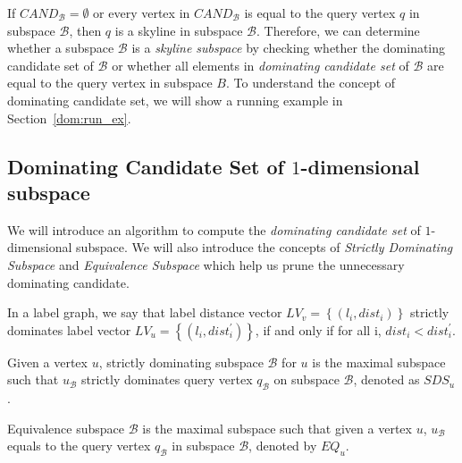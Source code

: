 If $\mathit{CAND}_\mathcal{B} = \emptyset$ or every vertex in $\mathit{CAND}_\mathcal{B}$ is equal to the query vertex $q$ in subspace $\mathcal{B}$, then $q$ is a skyline in subspace $\mathcal{B}$. Therefore, we can determine whether a subspace $\mathcal{B}$ is a \emph{skyline subspace} by checking whether the dominating candidate set of $\mathcal{B}$ or whether all elements in \emph{dominating candidate set} of $\mathcal{B}$ are equal to the query vertex in subspace $B$. To understand the concept of dominating candidate set, we will show a running example in Section~\ref{dom:run_ex}.

\subsection{Dominating Candidate Set of $1$-dimensional subspace}

We will introduce an algorithm to compute the \emph{dominating candidate set} of $1$-dimensional subspace. We will also introduce the concepts of \emph{Strictly Dominating Subspace} and \emph{Equivalence Subspace} which help us prune the unnecessary dominating candidate.

\begin{definition}
In a label graph, we say that label distance vector $LV_v=\left\{(l_i, dist_i)\right\}$ strictly dominates label vector $LV_u=\left\{(l_i, dist_i^\prime)\right\}$, if and only if for all i, $dist_i < dist_i^\prime$.
\end{definition}

\begin{definition}
Given a vertex $u$, strictly dominating subspace $\mathcal{B}$ for $u$ is the maximal subspace such that $u_\mathcal{B}$ strictly dominates query vertex $q_\mathcal{B}$ on subspace $\mathcal{B}$, denoted as $\mathit{SDS}_u$.
\end{definition}

\begin{definition}
Equivalence subspace $\mathcal{B}$ is the maximal subspace such that given a vertex $u$, $u_\mathcal{B}$ equals to the query vertex $q_\mathcal{B}$ in subspace $\mathcal{B}$, denoted by $\mathit{EQ}_u$.
\end{definition}


